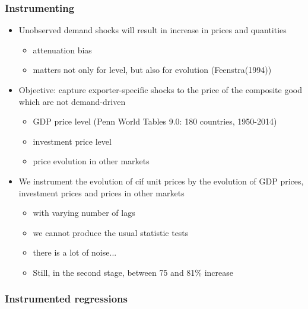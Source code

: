\documentclass{beamer}
\begin{document}
\begin{frame}[plain]\frametitle{Instrumenting}
\vspace{0.3cm}
\begin{itemize}
	\item Unobserved demand shocks will result in increase in prices and quantities
	\begin{itemize}
		\item attenuation bias
		\item matters not only for level, but also for evolution (Feenstra(1994))
	\end{itemize}
	\item Objective: capture exporter-specific shocks to the price of the composite good which are not demand-driven
	\begin{itemize}
		\item GDP price level (Penn World Tables 9.0: 180 countries, 1950-2014)
		\item investment price level 
		\item price evolution in other markets
	\end{itemize}
	\item We instrument the evolution of cif unit prices by the evolution of GDP prices, investment prices and prices in other markets
	\begin{itemize}
		\item with varying number of lags
		\item we cannot produce the usual statistic tests
		\item there is a lot of noise...
		\item Still, in the second stage, between 75 and 81\% increase
	\end{itemize}
\end{itemize}
\end{frame}

\begin{frame}[plain]\frametitle{Instrumented regressions}
	\begin{figure}[h!]
		\begin{center}
			\setlength{\fboxrule}{1pt} %
			\setlength{\fboxsep}{.1in} %
		\end{center}
	\end{figure}
\end{frame}
\end{document}
